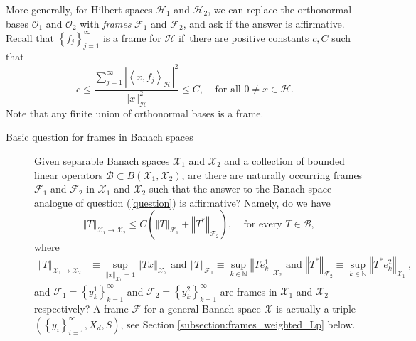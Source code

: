\documentclass{amsart}%
\theoremstyle{plain}
\numberwithin{equation}{section}
\begin{document}
More generally, for Hilbert spaces $\mathcal{H}_{1}$ and $\mathcal{H}_{2}$, we
can replace the orthonormal bases $\mathcal{O}_{1}$ and $\mathcal{O}_{2}$ with
\emph{frames} $\mathcal{F}_{1}$ and $\mathcal{F}_{2}$, and ask if the answer
is affirmative. Recall that $\left\{  f_{j}\right\}  _{j=1}^{\infty}$ is a
frame for $\mathcal{H}$ if\ there are positive constants $c,C$ such that%
\[
c\leq\frac{\sum_{j=1}^{\infty}\left\vert \left\langle x,f_{j}\right\rangle
_{\mathcal{H}}\right\vert ^{2}}{\left\Vert x\right\Vert _{\mathcal{H}}^{2}%
}\leq C,\ \ \ \ \ \text{for all }0\neq x\in\mathcal{H}.
\]
Note that any finite union of orthonormal bases is a frame.

\begin{description}
\item[Basic question for frames in Banach spaces] Given separable Banach
spaces $\mathcal{X}_{1}$ and $\mathcal{X}_{2}$ and a collection of bounded
linear operators $\mathcal{B}\subset B\left(  \mathcal{X}_{1},\mathcal{X}%
_{2}\right)  $, are there are naturally occurring frames $\mathcal{F}%
_{1}$ and $\mathcal{F}_{2}$ in $\mathcal{X}_{1}$ and $\mathcal{X}_{2}$ such
that the answer to the Banach space analogue of question (\ref{question}) is
affirmative? Namely, do we have 
\begin{equation}
\left\Vert T\right\Vert _{\mathcal{X}_{1}\rightarrow\mathcal{X}_{2}}\leq
C\left(  \left\Vert T\right\Vert _{\mathcal{F}_{1}}+\left\Vert T^{\ast
}\right\Vert _{\mathcal{F}_{2}}\right)  ,\ \ \ \ \ \text{for every }%
T\in\mathcal{B},\label{Banach frame}%
\end{equation}
where%
\begin{align*}
\left\Vert T\right\Vert _{\mathcal{X}_{1}\rightarrow\mathcal{X}_{2}} &
\equiv\sup_{\left\Vert x\right\Vert _{\mathcal{X}_{1}}=1}\left\Vert
Tx\right\Vert _{\mathcal{X}_{2}}\text{ and }\left\Vert T\right\Vert
_{\mathcal{F}_{1}}\equiv\sup_{k\in\mathbb{N}}\left\Vert Te_{k}^{1}\right\Vert
_{\mathcal{X}_{2}}\text{ and }\left\Vert T^{\ast}\right\Vert _{\mathcal{F}%
_{2}}\equiv\sup_{k\in\mathbb{N}}\left\Vert T^{\ast}e_{k}^{2}\right\Vert
_{\mathcal{X}_{1}}\ ,
\end{align*}
and $\mathcal{F}_{1}   =\left\{  y_{k}^{1}\right\}  _{k=1}^{\infty
}$ and $\mathcal{F}_{2}=\left\{  y_{k}^{2}\right\}  _{k=1}^{\infty}$
are frames in $\mathcal{X}_{1}$ and $\mathcal{X}_{2}$ respectively? A frame $\mathcal{F}$ for a general Banach space $\mathcal{X}$ is actually a
triple $\left(  \left\{  y_{i}\right\}  _{i=1}^{\infty},X_{d},S\right)  $, see
Section \ref{subsection:frames_weighted_Lp} below.
\end{description}
\end{document}
